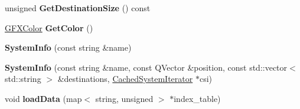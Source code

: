 \begin{DoxyCompactItemize}
\item 
unsigned {\bfseries Get\+Destination\+Size} () const \hypertarget{structNavigationSystem_1_1CachedSystemIterator_1_1SystemInfo_a9310d22000958aa5e1d5811dc1f3b367}{}\label{structNavigationSystem_1_1CachedSystemIterator_1_1SystemInfo_a9310d22000958aa5e1d5811dc1f3b367}

\item 
\hyperlink{structGFXColor}{G\+F\+X\+Color} {\bfseries Get\+Color} ()\hypertarget{structNavigationSystem_1_1CachedSystemIterator_1_1SystemInfo_a6b881e49e12ffa30806b1c00e33198c9}{}\label{structNavigationSystem_1_1CachedSystemIterator_1_1SystemInfo_a6b881e49e12ffa30806b1c00e33198c9}

\item 
{\bfseries System\+Info} (const string \&name)\hypertarget{structNavigationSystem_1_1CachedSystemIterator_1_1SystemInfo_a7b87a003999feeabfe7b0a1673bdb29c}{}\label{structNavigationSystem_1_1CachedSystemIterator_1_1SystemInfo_a7b87a003999feeabfe7b0a1673bdb29c}

\item 
{\bfseries System\+Info} (const string \&name, const Q\+Vector \&position, const std\+::vector$<$ std\+::string $>$ \&destinations, \hyperlink{classNavigationSystem_1_1CachedSystemIterator}{Cached\+System\+Iterator} $\ast$csi)\hypertarget{structNavigationSystem_1_1CachedSystemIterator_1_1SystemInfo_ab3b296801fcd84a3d9569afc6eb77cbb}{}\label{structNavigationSystem_1_1CachedSystemIterator_1_1SystemInfo_ab3b296801fcd84a3d9569afc6eb77cbb}

\item 
void {\bfseries load\+Data} (map$<$ string, unsigned $>$ $\ast$index\+\_\+table)\hypertarget{structNavigationSystem_1_1CachedSystemIterator_1_1SystemInfo_af1b4cbd65398836972c403de491eef40}{}\label{structNavigationSystem_1_1CachedSystemIterator_1_1SystemInfo_af1b4cbd65398836972c403de491eef40}

\end{DoxyCompactItemize}
